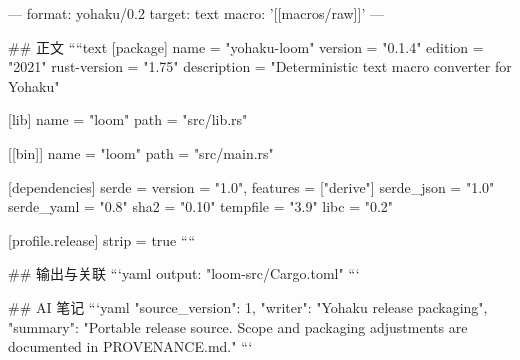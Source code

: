 ---
format: yohaku/0.2
target: text
macro: '[[macros/raw]]'
---

## 正文
````text
[package]
name = "yohaku-loom"
version = "0.1.4"
edition = "2021"
rust-version = "1.75"
description = "Deterministic text macro converter for Yohaku"

[lib]
name = "loom"
path = "src/lib.rs"

[[bin]]
name = "loom"
path = "src/main.rs"

[dependencies]
serde = { version = "1.0", features = ["derive"] }
serde_json = "1.0"
serde_yaml = "0.8"
sha2 = "0.10"
tempfile = "3.9"
libc = "0.2"

[profile.release]
strip = true
````

## 输出与关联
```yaml
output: "loom-src/Cargo.toml"
```

## AI 笔记
```yaml
{"source_version": 1, "writer": "Yohaku release packaging", "summary": "Portable release source. Scope and packaging adjustments are documented in PROVENANCE.md."}
```
